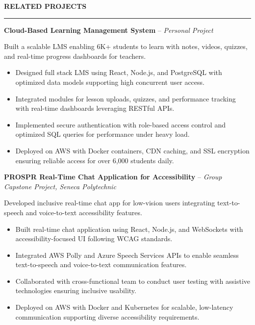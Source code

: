 \documentclass[10pt,letterpaper]{article}
\begin{document}
\vspace{6pt}

\textbf{RELATED PROJECTS}\\[-8pt]
\noindent\rule{\textwidth}{1pt}

\vspace{-2pt}

\textbf{Cloud-Based Learning Management System} -- \emph{Personal Project}

\vspace{-1pt}

Built a scalable LMS enabling 6K+ students to learn with notes, videos, quizzes, and real-time progress dashboards for teachers.
\vspace{-1pt}
\begin{itemize}
\item Designed full stack LMS using React, Node.js, and PostgreSQL with optimized data models supporting high concurrent user access.
\item Integrated modules for lesson uploads, quizzes, and performance tracking with real-time dashboards leveraging RESTful APIs.
\item Implemented secure authentication with role-based access control and optimized SQL queries for performance under heavy load.
\item Deployed on AWS with Docker containers, CDN caching, and SSL encryption ensuring reliable access for over 6,000 students daily.
\end{itemize}

\textbf{PROSPR  Real-Time Chat Application for Accessibility} -- \emph{Group Capstone Project, Seneca Polytechnic}

\vspace{-1pt}

Developed inclusive real-time chat app for low-vision users integrating text-to-speech and voice-to-text accessibility features.
\vspace{-1pt}
\begin{itemize}
\item Built real-time chat application using React, Node.js, and WebSockets with accessibility-focused UI following WCAG standards.
\item Integrated AWS Polly and Azure Speech Services APIs to enable seamless text-to-speech and voice-to-text communication features.
\item Collaborated with cross-functional team to conduct user testing with assistive technologies ensuring inclusive usability.
\item Deployed on AWS with Docker and Kubernetes for scalable, low-latency communication supporting diverse accessibility requirements.
\end{itemize}
\end{document}
